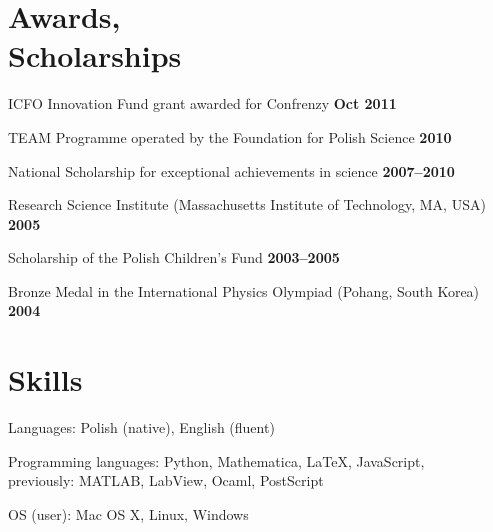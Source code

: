 \documentclass[margin,line]{resume}
\begin{document}
\begin{resume}
    \section{\mysidestyle Awards,\\Scholarships}
    \begin{list2}
    	\item ICFO Innovation Fund grant awarded for Confrenzy \hfill {\bf Oct 2011}
        \item TEAM Programme operated by the Foundation for Polish Science \hfill {\bf 2010}
        \item National Scholarship for exceptional achievements in science \hfill {\bf 2007--2010}
        \item Research Science Institute (Massachusetts Institute of Technology, MA, USA) \hfill {\bf 2005}
        \item Scholarship of the Polish Children's Fund \hfill {\bf 2003--2005}
        \item Bronze Medal in the International Physics Olympiad (Pohang, South Korea) \hfill {\bf 2004}
    \end{list2}


    \section{\mysidestyle Skills}
    \begin{list2}
        \item Languages: Polish (native), English (fluent)
        \item Programming languages: Python, Mathematica, LaTeX, JavaScript,\\
        previously: MATLAB, LabView, Ocaml, PostScript
        \item OS (user): Mac OS X, Linux, Windows
    \end{list2}


\end{resume}
\end{document}

